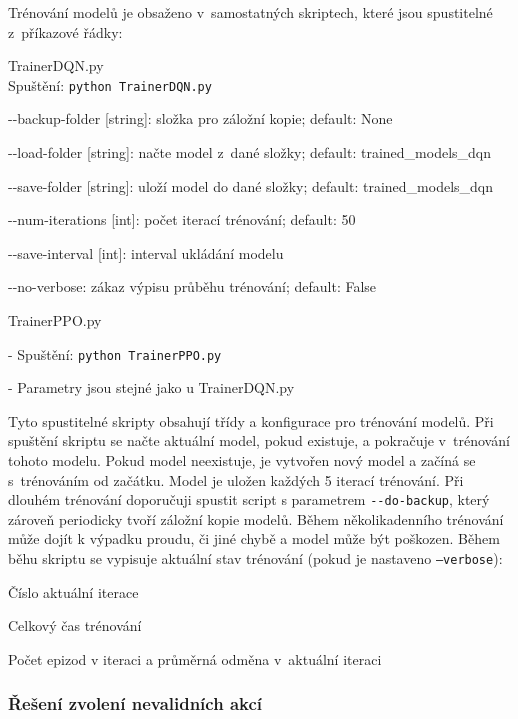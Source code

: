 Trénování modelů je obsaženo v~samostatných skriptech, které jsou spustitelné z~příkazové řádky:
\begin{myitemize}
  \item TrainerDQN.py\\
  Spuštění: \texttt{python TrainerDQN.py}
  \begin{myitemize}[${}$]
    \item -{}-backup-folder [string]: složka pro záložní kopie; default: None
    \item -{}-load-folder [string]: načte model z~dané složky; default: trained\_models\_dqn
    \item -{}-save-folder [string]: uloží model do dané složky; default: trained\_models\_dqn
    \item -{}-num-iterations [int]: počet iterací trénování; default: 50
    \item -{}-save-interval [int]: interval ukládání modelu
    \item -{}-no-verbose: zákaz výpisu průběhu trénování; default: False
  \end{myitemize}
  \item TrainerPPO.py
  \item - Spuštění: \texttt{python TrainerPPO.py}
  \item - Parametry jsou stejné jako u TrainerDQN.py
\end{myitemize}

Tyto spustitelné skripty obsahují třídy a konfigurace pro trénování modelů.
Při spuštění skriptu se načte aktuální model, pokud existuje, a pokračuje v~trénování tohoto modelu.
Pokud model neexistuje, je vytvořen nový model a začíná se s~trénováním od začátku.
Model je uložen každých 5 iterací trénování.
Při dlouhém trénování doporučuji spustit script s parametrem \texttt{-{}-do-backup}, který zároveň periodicky tvoří záložní kopie modelů.
Během několikadenního trénování může dojít k výpadku proudu, či jiné chybě a model může být poškozen.
Během běhu skriptu se vypisuje aktuální stav trénování (pokud je nastaveno \texttt{--verbose}):
\begin{myitemize}
  \item Číslo aktuální iterace
  \item Celkový čas trénování
  \item Počet epizod v iteraci a průměrná odměna v~aktuální iteraci
\end{myitemize}

\subsubsection*{Řešení zvolení nevalidních akcí}
\label{subsubsec:nevalidni_akce}

